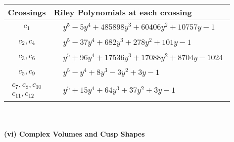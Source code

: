 \documentclass[1p]{elsarticle_modified}
\theoremstyle{definition}
\begin{document}
\begin{tabular}{m{50pt}|m{274pt}}
Crossings & \hspace{64pt}Riley Polynomials at each crossing \\
\hline $$\begin{aligned}c_{1}\end{aligned}$$&$\begin{aligned}
&y^5-5 y^4+485898 y^3+60406 y^2+10757 y-1
\end{aligned}$\\
\hline $$\begin{aligned}c_{2},c_{4}\end{aligned}$$&$\begin{aligned}
&y^5-37 y^4+682 y^3+278 y^2+101 y-1
\end{aligned}$\\
\hline $$\begin{aligned}c_{3},c_{6}\end{aligned}$$&$\begin{aligned}
&y^5+96 y^4+17536 y^3+17088 y^2+8704 y-1024
\end{aligned}$\\
\hline $$\begin{aligned}c_{5},c_{9}\end{aligned}$$&$\begin{aligned}
&y^5- y^4+8 y^3-3 y^2+3 y-1
\end{aligned}$\\
\hline $$\begin{aligned}c_{7},c_{8},c_{10}\\c_{11},c_{12}\end{aligned}$$&$\begin{aligned}
&y^5+15 y^4+64 y^3+37 y^2+3 y-1
\end{aligned}$\\
\hline
\end{tabular}\\~\\
\newpage\flushleft \textbf{(vi) Complex Volumes and Cusp Shapes}
\end{document}
